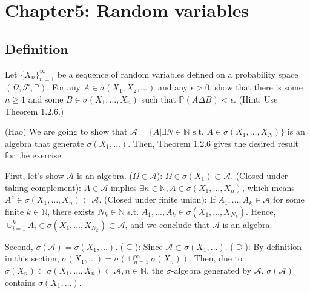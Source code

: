 \section{Chapter5: Random variables}

\subsection{Definition}

\begin{exercise}\label{5.1.2}
Let $\{X_n\}_{n=1}^\infty$ be a sequence of random variables defined on a probability space $(\Omega, \mathcal{F}, \mathbb{P})$. For any $A \in \sigma(X_1, X_2, \dots)$ and any $\epsilon > 0$, show
that there is some $n\geq 1$ and some $B \in \sigma(X_1, \dots, X_n)$ such that $\mathbb{P}(A\Delta B) < \epsilon$.
(Hint: Use Theorem 1.2.6.)
\end{exercise}
\begin{answer} (Hao)
    We are going to show that $\mathcal{A} = \{A|\exists N\in \mathbb{N} \text{ s.t. } A \in \sigma(X_1,\dots, X_N)\}$ is an algebra that generate $\sigma(X_1,\dots)$. Then, Theorem 1.2.6 gives the desired result for the exercise.
    
     First, let's show $\mathcal{A}$ is an algebra. ($\Omega \in \mathcal{A}$): $\Omega \in \sigma(X_1) \subset \mathcal{A}$. (Closed under taking complement): $A\in \mathcal{A}$ implies $\exists n\in \mathbb{N}, A\in \sigma(X_1,\dots,X_n)$, which means $A^c \in \sigma(X_1,\dots,X_n) \subset \mathcal{A}$. (Closed under finite union): If $A_{1},\dots, A_k \in \mathcal{A}$ for some finite $k\in \mathbb{N}$, there exists $N_k \in \mathbb{N}$ s.t.  $A_1,\dots, A_k \in \sigma(X_1,\dots, X_{N_k})$. Hence, $\cup_{i=1}^k A_i \in \sigma(X_1,\dots, X_{N_k})\subset \mathcal{A}$, and we conclude that $\mathcal{A}$ is an algebra.
     
     Second, $\sigma(\mathcal{A}) = \sigma(X_1,\dots)$.
        ($\subseteq$): Since $\mathcal{A} \subset \sigma(X_1,\dots)$. ($\supseteq$): By definition in this section, $\sigma(X_1,\dots) = \sigma(\cup_{n=1}^\infty\sigma(X_n))$. Then, due to  $\sigma(X_n)\subset \sigma(X_1,\dots,X_n)\subset \mathcal{A}, n \in \mathbb{N}$, the $\sigma$-algebra generated by $\mathcal{A}$, $\sigma(\mathcal{A})$ contains $\sigma(X_1,\dots)$.
        
\end{answer}